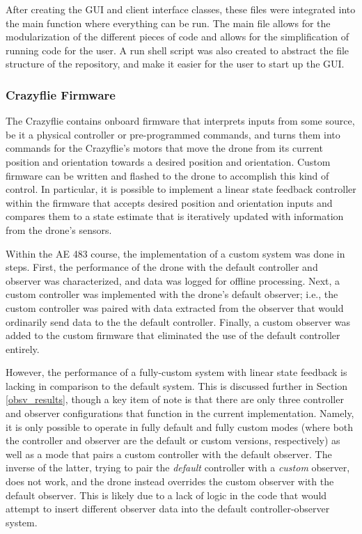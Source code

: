 \documentclass[conf]{new-aiaa}
\begin{document}
            After creating the GUI and client interface classes, these files were integrated into the main function where everything can be run. The main file allows for the modularization of the different pieces of code and allows for the simplification of running code for the user. A run shell script was also created to abstract the file structure of the repository, and make it easier for the user to start up the GUI. 
        
        \subsubsection{Crazyflie Firmware}\label{crazyflie_firmware}
        
            The Crazyflie contains onboard firmware that interprets inputs from some source, be it a physical controller or pre-programmed commands, and turns them into commands for the Crazyflie's motors that move the drone from its current position and orientation towards a desired position and orientation. Custom firmware can be written and flashed to the drone to accomplish this kind of control. In particular, it is possible to implement a linear state feedback controller within the firmware that accepts desired position and orientation inputs and compares them to a state estimate that is iteratively updated with information from the drone's sensors.
            
            Within the AE 483 course, the implementation of a custom system was done in steps. First, the performance of the drone with the default controller and observer was characterized, and data was logged for offline processing. Next, a custom controller was implemented with the drone's default observer; i.e., the custom controller was paired with data extracted from the observer that would ordinarily send data to the the default controller. Finally, a custom observer was added to the custom firmware that eliminated the use of the default controller entirely.
            
            However, the performance of a fully-custom system with linear state feedback is lacking in comparison to the default system. This is discussed further in Section \ref{obsv_results}, though a key item of note is that there are only three controller and observer configurations that function in the current implementation. Namely, it is only possible to operate in fully default and fully custom modes (where both the controller and observer are the default or custom versions, respectively) as well as a mode that pairs a custom controller with the default observer. The inverse of the latter, trying to pair the \textit{default} controller with a \textit{custom} observer, does not work, and the drone instead overrides the custom observer with the default observer. This is likely due to a lack of logic in the code that would attempt to insert different observer data into the default controller-observer system.
\end{document}
